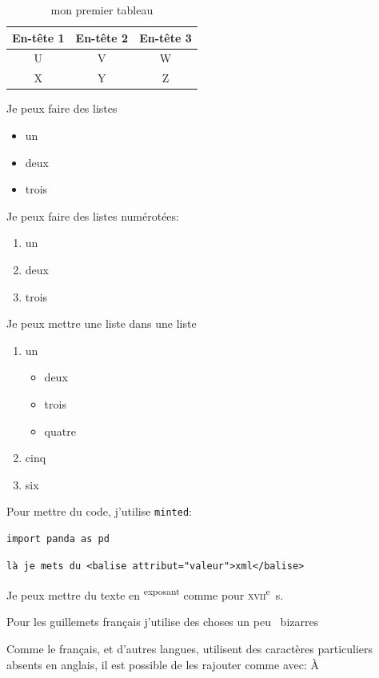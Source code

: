 \documentclass[paper=a4,
               fontsize=11pt,
               twoside, %
              ]{article}
\begin{document}
    \begin{table}[!htp]
        \centering
        \begin{tabular}{c|cc}
            En-tête 1 & En-tête 2 & En-tête 3 \\
        \hline
            U & V & W \\
            X & Y & Z \\
        \end{tabular}
        \caption{mon premier tableau}
        \label{tab:tableau}
    \end{table}
    
    Je peux faire des listes
    \begin{itemize}
        \item un
        \item deux
        \item trois
    \end{itemize}

    Je peux faire des listes numérotées:
    \begin{enumerate}
        \item un
        \item deux
        \item trois
    \end{enumerate}
    
    Je peux mettre une liste dans une liste
    \begin{enumerate}
        \item un
        \begin{itemize}
            \item deux
            \item trois
            \item quatre
        \end{itemize}
        \item cinq
        \item six
    \end{enumerate}    

    Pour mettre du code, j'utilise \texttt{minted}:
    \begin{verbatim}
import panda as pd
    \end{verbatim}
    \begin{verbatim}
là je mets du <balise attribut="valeur">xml</balise>
    \end{verbatim}
    
    Je peux mettre du texte en \textsuperscript{exposant} comme pour \textsc{xvii}\textsuperscript{e}~s.
    
    Pour les guillemets français j'utilise des choses un peu \og~bizarres~\fg{}
    
    Comme le français, et d'autres langues, utilisent des caractères particuliers absents en anglais, il est possible de les rajouter comme avec: \`A
    
    
    \clearpage
    
    \printbibliography
\end{document}
